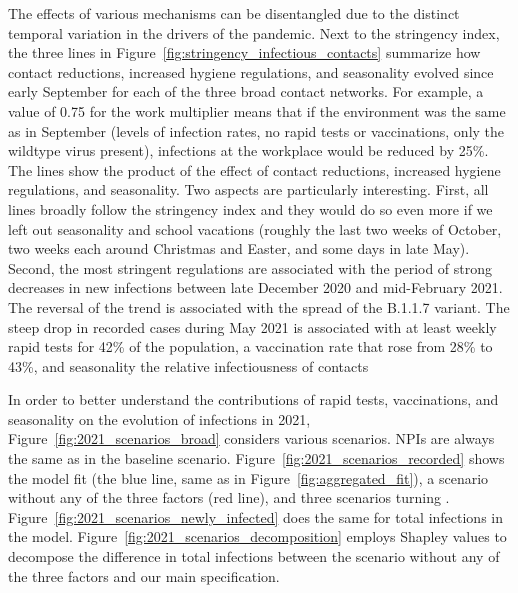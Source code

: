 The effects of various mechanisms can be disentangled due to the distinct temporal
variation in the drivers of the pandemic. Next to the stringency index, the three lines
in Figure~\ref{fig:stringency_infectious_contacts} summarize how contact reductions,
increased hygiene regulations, and seasonality evolved since early September for each of
the three broad contact networks. For example, a value of 0.75 for the work multiplier
means that if the environment was the same as in September (levels of infection rates, no
rapid tests or vaccinations, only the wildtype virus present), infections at the
workplace would be reduced by 25\%. The lines show the product of the effect of contact
reductions, increased hygiene regulations, and seasonality. Two aspects are particularly
interesting. First, all lines broadly follow the stringency index and they would do so
even more if we left out seasonality and school vacations (roughly the last two weeks of
October, two weeks each around Christmas and Easter, and some days in late May). Second,
the most stringent regulations are associated with the period of strong decreases in new
infections between late December 2020 and mid-February 2021. The reversal of the trend is
associated with the spread of the B.1.1.7 variant. The steep drop in recorded cases
during May 2021 is associated with at least weekly rapid tests for 42\% of the
population, a vaccination rate that rose from 28\% to 43\%, and 
seasonality  the relative
infectiousness of contacts 

In order to better understand the contributions  of rapid tests, vaccinations, and
seasonality on the evolution of infections in 2021, Figure~\ref{fig:2021_scenarios_broad}
considers various scenarios. NPIs are always the same as in the baseline scenario.
Figure~\ref{fig:2021_scenarios_recorded} shows the model fit (the blue line, same as in
Figure~\ref{fig:aggregated_fit}), a scenario without any of the three factors (red line),
and three scenarios turning . Figure~\ref{fig:2021_scenarios_newly_infected} does the same for total
infections in the model. Figure~\ref{fig:2021_scenarios_decomposition} employs Shapley
values \citep{Shapley2016} to decompose the difference in total infections between the
scenario without any of the three factors and our main specification.

